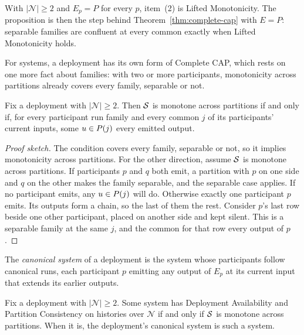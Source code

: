With $|\mathcal N|\ge2$ and $E_p=P$ for every $p$, item~(2) is Lifted
Monotonicity.  The proposition is then the step behind
Theorem~\ref{thm:complete-cap} with $E=P$: separable families are confluent at
every common \indesc exactly when Lifted Monotonicity holds.

For systems, a deployment has its own form of Complete CAP, which rests on one
more fact about families: with two or more participants, monotonicity across
partitions already covers every family, separable or not.

\begin{lemma}
\label{lem:deployment-compatible}
Fix a deployment with $|\mathcal N|\ge2$.  Then $\mathcal{S}$ is monotone across
partitions if and only if, for every participant run family and every common
\indesc $j$ of its participants' current inputs, some $u\in P(j)$
\outrel every emitted output.
\end{lemma}

\begin{proof}[Proof sketch]
The condition covers every family, separable or not, so it implies
monotonicity across partitions.  For the other direction, assume $\mathcal{S}$ is
monotone across partitions.  If participants $p$ and $q$ both emit, a
partition with $p$ on one side and $q$ on the other makes the family
separable, and the separable case applies.  If no participant emits, any
$u\in P(j)$ will do.  Otherwise exactly one participant $p$ emits.  Its
outputs form a chain, so the last of them \outrel the rest.  Consider $p$'s
last row beside one other participant, placed on another side and kept
silent.  This is a separable family at the same $j$, and the common \outnoun
for that row \outrel every output of $p$.
\end{proof}

The \emph{canonical system} of a deployment is the system whose participants
follow canonical runs, each participant $p$ emitting any output of $E_p$ at
its current input that extends its earlier outputs.

\begin{proposition}
\label{prop:deployment-complete-cap}
Fix a deployment with $|\mathcal N|\ge2$.  Some system has Deployment
Availability and Partition Consistency on histories over $\mathcal N$ if and
only if $\mathcal{S}$ is monotone across partitions.  When it is, the deployment's
canonical system is such a system.
\end{proposition}

